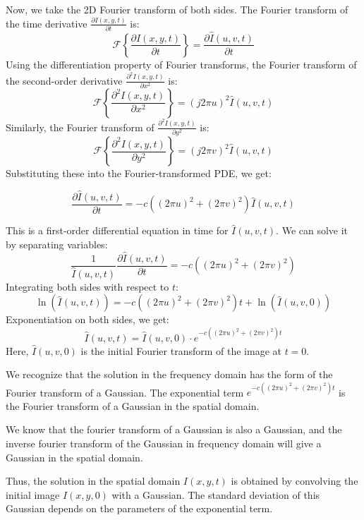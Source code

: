 \documentclass{article}
\begin{document}
Now, we take the 2D Fourier transform of both sides.
The Fourier transform of the time derivative \( \frac{\partial I(x, y, t)}{\partial t} \) is:
  \[
  \mathcal{F}\left\{\frac{\partial I(x, y, t)}{\partial t}\right\} = \frac{\partial \hat{I}(u, v, t)}{\partial t}
  \]
Using the differentiation property of Fourier transforms, the Fourier transform of the second-order derivative \( \frac{\partial^2 I(x, y, t)}{\partial x^2} \) is:
  \[
  \mathcal{F}\left\{ \frac{\partial^2 I(x, y, t)}{\partial x^2} \right\} = (j 2 \pi u)^2 \hat{I}(u, v, t)
  \]
Similarly, the Fourier transform of \( \frac{\partial^2 I(x, y, t)}{\partial y^2} \) is:
  \[
  \mathcal{F}\left\{ \frac{\partial^2 I(x, y, t)}{\partial y^2} \right\} = (j 2 \pi v)^2 \hat{I}(u, v, t)
  \]
Substituting these into the Fourier-transformed PDE, we get:

\[
\frac{\partial \hat{I}(u, v, t)}{\partial t} = -c \left( (2 \pi u)^2 + (2 \pi v)^2 \right) \hat{I}(u, v, t)
\]

This is a first-order differential equation in time for \( \hat{I}(u, v, t) \). We can solve it by separating variables:
\[
\frac{1}{\hat{I}(u, v, t)} \frac{\partial \hat{I}(u, v, t)}{\partial t} = -c \left( (2 \pi u)^2 + (2 \pi v)^2 \right)
\]
Integrating both sides with respect to \( t \):
\[
\ln(\hat{I}(u, v, t)) = -c \left( (2 \pi u)^2 + (2 \pi v)^2 \right) t + \ln(\hat{I}(u, v, 0))
\]
Exponentiation on both sides, we get:
\[
\hat{I}(u, v, t) = \hat{I}(u, v, 0) \cdot e^{-c \left( (2 \pi u)^2 + (2 \pi v)^2 \right) t}
\]
Here, \( \hat{I}(u, v, 0) \) is the initial Fourier transform of the image at \( t = 0 \).


We recognize that the solution in the frequency domain has the form of the Fourier transform of a Gaussian. The exponential term \( e^{-c \left( (2 \pi u)^2 + (2 \pi v)^2 \right) t} \) is the Fourier transform of a Gaussian in the spatial domain.
\vspace{5pt}

We know that the fourier transform of a Gaussian is also a Gaussian, and the inverse fourier transform of the Gaussian in frequency domain will give a Gaussian in the spatial domain.
\vspace{5pt}

Thus, the solution in the spatial domain \( I(x, y, t) \) is obtained by convolving the initial image \( I(x, y, 0) \) with a Gaussian. The standard deviation of this Gaussian depends on the parameters of the exponential term.
\end{document}
